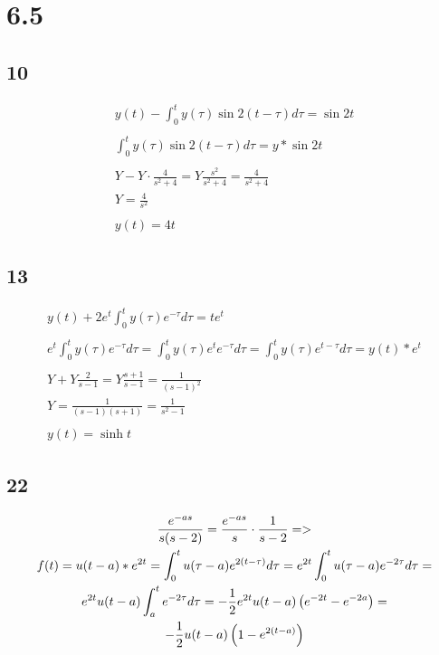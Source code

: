 \newpage

\section*{6.5}

\subsection*{10}


\begin{gather*}
	y(t) - \int_0^t{y(\tau) \sin{2(t - \tau)} d\tau} = \sin{2 t} \\ \\
	\int_0^t{y(\tau) \sin{2(t - \tau)} d\tau} = y * \sin{2 t} \\ \\
	Y - Y \cdot \frac{4}{s^2 + 4} =
	Y \frac{s^2}{s^2 + 4} = \frac{4}{s^2 + 4} \\
	Y = \frac{4}{s^2} \\ \\
	y(t) = 4 t
\end{gather*}


\subsection*{13}


\begin{gather*}
	y(t) + 2 e^t \int_0^t{y(\tau) e^{-\tau} d\tau} = t e^t \\ \\
	e^t \int_0^t{y(\tau) e^{-\tau} d\tau} =
	\int_0^t{y(\tau) e^t e^{-\tau} d\tau} = 
	\int_0^t{y(\tau) e^{t - \tau} d\tau} = y(t) * e^t \\ \\
	Y + Y \frac{2}{s - 1} = Y \frac{s + 1}{s - 1} = \frac{1}{(s - 1)^2} \\
	Y = \frac{1}{(s - 1) (s + 1)} =
	\frac{1}{s^2 - 1} \\ \\
	y(t) = \sinh{t}
\end{gather*}


\subsection*{22}


\begin{gather*}
	\frac{e^{- a s}}{s (s - 2)} =
	\frac{e^{- a s}}{s} \cdot \frac{1}{s - 2} => \\
	f(t) = u(t - a) * e^{2 t} = \int_0^t{u(\tau - a) e^{2(t - \tau)} d\tau} =
	e^{2 t} \int_0^t{u(\tau - a) e^{-2 \tau} d \tau} = \\
	e^{2 t} u(t - a) \int_a^t{e^{-2 \tau} d \tau} =
	- \frac{1}{2} e^{2 t} u(t - a) \left( e^{-2 t} - e^{-2 a} \right) = \\
	- \frac{1}{2} u(t - a) \left( 1 - e^{2 (t - a)} \right)
\end{gather*}


